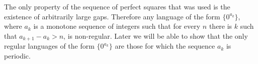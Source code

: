

\setcounter{section}{3}
\setcounter{subsection}{2}
\setcounter{dfn}{5}


The only property of the sequence of perfect squares that was used is the existence of arbitrarily large gaps.
Therefore any language of the form $\{0^{a_k}\}$,
where $a_k$ is a monotone sequence of integers such that for every $n$ there is $k$ such that $a_{k+1} - a_k > n$, is non-regular.
Later we will be able to show that the only regular languages of the form $\{0^{a_k}\}$ are those for which the sequence $a_k$ is periodic.



